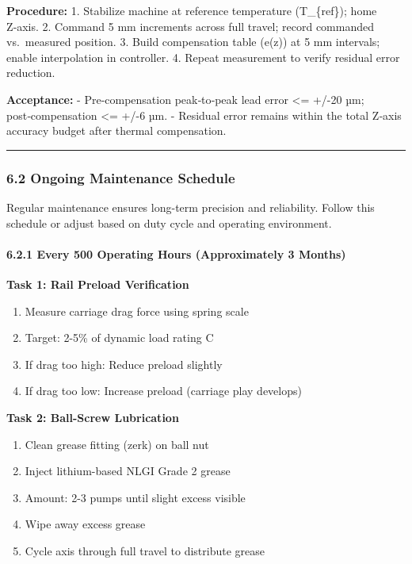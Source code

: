 \documentclass[
]{article}
\providecommand{\tightlist}{%
  \setlength{\itemsep}{0pt}\setlength{\parskip}{0pt}}
\begin{document}
\textbf{Procedure:} 1. Stabilize machine at reference temperature
(T\_\{ref\}); home Z‑axis. 2. Command 5 mm increments across full
travel; record commanded vs.~measured position. 3. Build compensation
table (e(z)) at 5 mm intervals; enable interpolation in controller. 4.
Repeat measurement to verify residual error reduction.

\textbf{Acceptance:} - Pre‑compensation peak‑to‑peak lead error
\textless= +/-20 µm; post‑compensation \textless= +/-6 µm. - Residual
error remains within the total Z‑axis accuracy budget after thermal
compensation.

\begin{center}\rule{0.5\linewidth}{0.5pt}\end{center}

\subsubsection{6.2 Ongoing Maintenance
Schedule}\label{ongoing-maintenance-schedule}

Regular maintenance ensures long-term precision and reliability. Follow
this schedule or adjust based on duty cycle and operating environment.

\paragraph{6.2.1 Every 500 Operating Hours (Approximately 3
Months)}\label{every-500-operating-hours-approximately-3-months}

\textbf{Task 1: Rail Preload Verification}

\begin{enumerate}
\def\labelenumi{\arabic{enumi}.}
\tightlist
\item
  Measure carriage drag force using spring scale
\item
  Target: 2-5\% of dynamic load rating C
\item
  If drag too high: Reduce preload slightly
\item
  If drag too low: Increase preload (carriage play develops)
\end{enumerate}

\textbf{Task 2: Ball-Screw Lubrication}

\begin{enumerate}
\def\labelenumi{\arabic{enumi}.}
\tightlist
\item
  Clean grease fitting (zerk) on ball nut
\item
  Inject lithium-based NLGI Grade 2 grease
\item
  Amount: 2-3 pumps until slight excess visible
\item
  Wipe away excess grease
\item
  Cycle axis through full travel to distribute grease
\end{enumerate}
\end{document}
